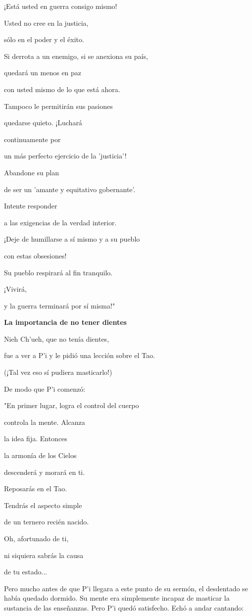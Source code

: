 ¡Está usted en guerra consigo mismo!

Usted no cree en la justicia,

sólo en el poder y el éxito.

Si derrota a un enemigo, si se anexiona su país,

quedará un menos en paz

con usted mismo de lo que está ahora.

Tampoco le permitirán sus pasiones

quedarse quieto. ¡Luchará

continuamente por

un más perfecto ejercicio de la 'justicia'!

Abandone su plan

de ser un 'amante y equitativo gobernante'.

Intente responder

a las exigencias de la verdad interior.

¡Deje de humillarse a sí mismo y a su pueblo

con estas obsesiones!

Su pueblo respirará al fin tranquilo.

¡Vivirá,

y la guerra terminará por sí misma!"

\textbf{{La importancia de no tener dientes}}

Nieh Ch'ueh, que no tenía dientes,

fue a ver a P'i y le pidió una lección sobre el Tao.

(¡Tal vez eso sí pudiera masticarlo!)

De modo que P'i comenzó:

"En primer lugar, logra el control del cuerpo

controla la mente. Alcanza

la idea fija. Entonces

la armonía de los Cielos

descenderá y morará en ti.

Reposarás en el Tao.

Tendrás el aspecto simple

de un ternero recién nacido.

Oh, afortunado de ti,

ni siquiera sabrás la causa

de tu estado...

Pero mucho antes de que P'i llegara a este punto de su sermón, el
desdentado se había quedado dormido. Su mente era simplemente incapaz de
masticar la sustancia de las enseñanzas. Pero P'i quedó satisfecho. Echó
a andar cantando:

